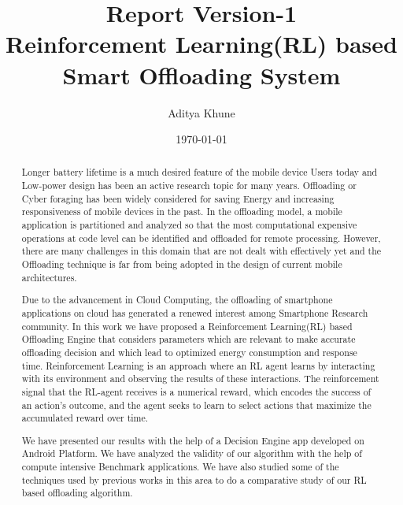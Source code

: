 \documentclass[12pt]{report}
\begin{document}
\title{Report Version-1\\
Reinforcement Learning(RL) based\\
Smart Offloading System}
\author{Aditya Khune}
\date{\today}  %
\maketitle


\tableofcontents


\begin{abstract}
Longer battery lifetime is a much desired feature of the mobile device Users today and Low-power design has been an active research topic for many years. 
Offloading or Cyber foraging has been widely considered for saving Energy and increasing responsiveness of mobile devices in the past.
In the offloading model, a mobile application is partitioned and analyzed so
that the most computational expensive operations at code level can be identified and offloaded for remote processing.
However, there are many challenges in this domain that are not dealt with effectively yet and the Offloading technique is far from being adopted in the design of current mobile architectures.

Due to the advancement in Cloud Computing, the offloading of smartphone applications on cloud has generated a renewed interest among Smartphone Research community.
In this work we have proposed a Reinforcement Learning(RL) based Offloading Engine that considers parameters which are relevant to make accurate offloading decision and which lead to optimized energy consumption and response time. Reinforcement Learning is an approach where an RL agent learns by interacting with its environment and observing the results of these interactions. The reinforcement signal that the RL-agent receives is a numerical reward, which encodes the success of an action’s outcome, and the agent seeks to learn to select actions that maximize the accumulated reward over time.

We have presented our results with the help of a Decision Engine app developed on Android Platform. We have analyzed the validity of our algorithm with the help of compute intensive Benchmark applications. We have also studied some of the techniques used by previous works in this area to do a comparative study of our RL based offloading algorithm.
\end{abstract}
\end{document}
